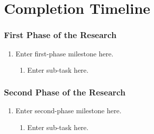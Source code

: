 \newpage
{}

\chapter{Completion Timeline}
\label{chap:timeline}

\subsection*{First Phase of the Research}
\begin{enumerate}[label=\arabic*.]
    \item Enter first-phase milestone here.
    \begin{enumerate}[label=\alph*)]
        \item Enter sub-task here.
    \end{enumerate}
\end{enumerate}

\subsection*{Second Phase of the Research}
\begin{enumerate}[label=\arabic*.]
    \item Enter second-phase milestone here.
    \begin{enumerate}[label=\alph*)]
        \item Enter sub-task here.
    \end{enumerate}
\end{enumerate}
